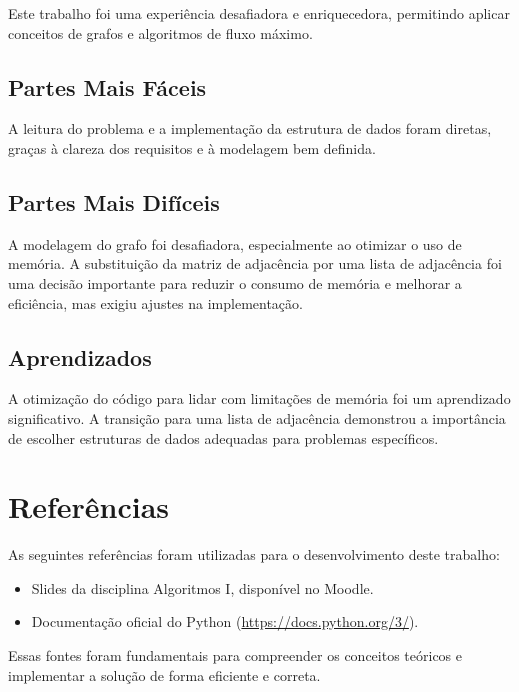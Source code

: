 \documentclass[a4paper,12pt]{article}
\begin{document}
Este trabalho foi uma experiência desafiadora e enriquecedora, permitindo aplicar conceitos de grafos e algoritmos de fluxo máximo.

\subsection*{Partes Mais Fáceis}
A leitura do problema e a implementação da estrutura de dados foram diretas, graças à clareza dos requisitos e à modelagem bem definida.

\subsection*{Partes Mais Difíceis}
A modelagem do grafo foi desafiadora, especialmente ao otimizar o uso de memória. A substituição da matriz de adjacência por uma lista de adjacência foi uma decisão importante para reduzir o consumo de memória e melhorar a eficiência, mas exigiu ajustes na implementação.

\subsection*{Aprendizados}
A otimização do código para lidar com limitações de memória foi um aprendizado significativo. A transição para uma lista de adjacência demonstrou a importância de escolher estruturas de dados adequadas para problemas específicos.

\section*{Referências}

As seguintes referências foram utilizadas para o desenvolvimento deste
trabalho:

\begin{itemize}
    \item Slides da disciplina Algoritmos I, disponível no Moodle.
    \item Documentação oficial do Python (\url{https://docs.python.org/3/}).
\end{itemize}

Essas fontes foram fundamentais para compreender os conceitos teóricos e
implementar a solução de forma eficiente e correta.
\end{document}
